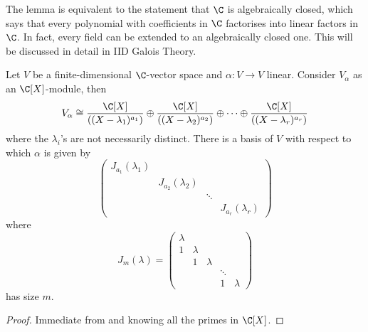\documentclass[a4paper]{article}
\theoremstyle{definition}
\begin{document}
\begin{remark}
  The lemma is equivalent to the statement that \(\C\) is algebraically closed, which says that every polynomial with coefficients in \(\C\) factorises into linear factors in \(\C\). In fact, every field can be extended to an algebraically closed one. This will be discussed in detail in IID Galois Theory.
\end{remark}

\begin{theorem}
  Let \(V\) be a finite-dimensional \(\C\)-vector space and \(\alpha:V \to V\) linear. Consider \(V_\alpha\) as an \(\C[X]\)-module, then
  \[
    V_\alpha \cong \frac{\C[X]}{((X - \lambda_1)^{a_1})} \oplus \frac{\C[X]}{((X - \lambda_2)^{a_2})} \oplus \dots \oplus \frac{\C[X]}{((X - \lambda_r)^{a_r})}
    \]
    where the \(\lambda_i\)'s are not necessarily distinct. There is a basis of \(V\) with respect to which \(\alpha\) is given by
    \[
      \begin{pmatrix}
        J_{a_1}(\lambda_1) \\
        & J_{a_2}(\lambda_2) \\
        & & \ddots \\
        & & & J_{a_r}(\lambda_r)
      \end{pmatrix}
    \]
    where
    \[
      J_m(\lambda) =
      \begin{pmatrix}
        \lambda \\
        1 & \lambda \\
        & 1 & \lambda \\
        & & & \ddots \\
        & & & 1 & \lambda
      \end{pmatrix}
    \]
    has size \(m\).
\end{theorem}

\begin{proof}
  Immediate from  and knowing all the primes in \(\C[X]\).
\end{proof}
\end{document}
